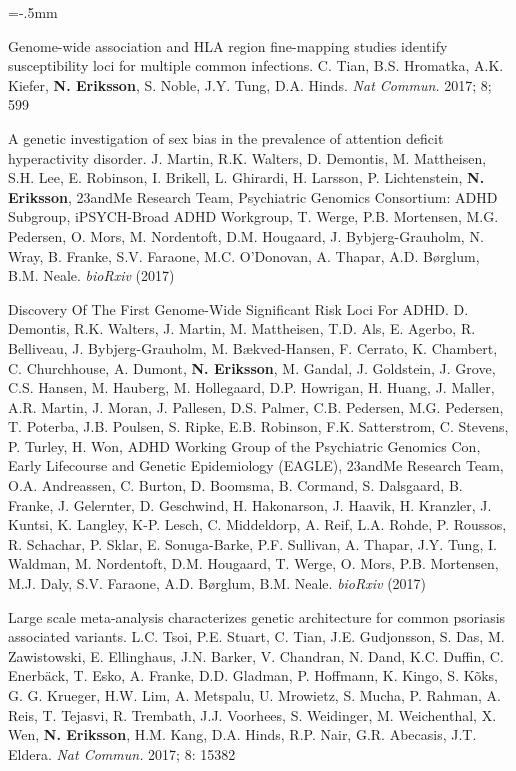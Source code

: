 \documentclass[11pt]{article}
\newenvironment{papers}[1][1]
	{\vspace{-2ex}\leftmargini=16.1mm%
	 \begin{revnumerate}[{#1}]\itemsep=-.5mm}
	{\end{revnumerate}\vspace{-2ex}}
\def\paper{\item}
\def\paperyear#1{\item[\addtocounter{enumi}{-1}%
		 {\makebox[0mm][r]{\makebox[14mm]{#1\hfill\arabic{enumi}.}}}]}
\begin{document}
\begin{papers}[47]
                    \paperyear{2017}
        Genome-wide association and HLA region fine-mapping studies identify susceptibility loci for multiple common infections.
        C. Tian, B.S. Hromatka, A.K. Kiefer, \textbf{N. Eriksson}, S. Noble, J.Y. Tung, D.A. Hinds.
        \textit{Nat Commun.} 2017; 8; 599

            \paper
        A genetic investigation of sex bias in the prevalence of attention deficit hyperactivity disorder.
        J. Martin, R.K. Walters, D. Demontis, M. Mattheisen, S.H. Lee, E. Robinson, I. Brikell, L. Ghirardi, H. Larsson, P. Lichtenstein, \textbf{N. Eriksson}, 23andMe Research Team, Psychiatric Genomics Consortium: ADHD Subgroup, iPSYCH-Broad ADHD Workgroup, T. Werge, P.B. Mortensen, M.G. Pedersen, O. Mors, M. Nordentoft, D.M. Hougaard, J. Bybjerg-Grauholm, N. Wray, B. Franke, S.V. Faraone, M.C. O'Donovan, A. Thapar, A.D. Børglum, B.M. Neale.
        \textit{bioRxiv} (2017)

            \paper
        Discovery Of The First Genome-Wide Significant Risk Loci For ADHD.
        D. Demontis, R.K. Walters, J. Martin, M. Mattheisen, T.D. Als, E. Agerbo, R. Belliveau, J. Bybjerg-Grauholm, M. Bækved-Hansen, F. Cerrato, K. Chambert, C. Churchhouse, A. Dumont, \textbf{N. Eriksson}, M. Gandal, J. Goldstein, J. Grove, C.S. Hansen, M. Hauberg, M. Hollegaard, D.P. Howrigan, H. Huang, J. Maller, A.R. Martin, J. Moran, J. Pallesen, D.S. Palmer, C.B. Pedersen, M.G. Pedersen, T. Poterba, J.B. Poulsen, S. Ripke, E.B. Robinson, F.K. Satterstrom, C. Stevens, P. Turley, H. Won, ADHD Working Group of the Psychiatric Genomics Con, Early Lifecourse and Genetic Epidemiology (EAGLE), 23andMe Research Team, O.A. Andreassen, C. Burton, D. Boomsma, B. Cormand, S. Dalsgaard, B. Franke, J. Gelernter, D. Geschwind, H. Hakonarson, J. Haavik, H. Kranzler, J. Kuntsi, K. Langley, K-P. Lesch, C. Middeldorp, A. Reif, L.A. Rohde, P. Roussos, R. Schachar, P. Sklar, E. Sonuga-Barke, P.F. Sullivan, A. Thapar, J.Y. Tung, I. Waldman, M. Nordentoft, D.M. Hougaard, T. Werge, O. Mors, P.B. Mortensen, M.J. Daly, S.V. Faraone, A.D. Børglum, B.M. Neale.
        \textit{bioRxiv} (2017)

            \paper
        Large scale meta-analysis characterizes genetic architecture for common psoriasis associated variants.
        L.C. Tsoi, P.E. Stuart, C. Tian, J.E. Gudjonsson, S. Das, M. Zawistowski, E. Ellinghaus, J.N. Barker, V. Chandran, N. Dand, K.C. Duffin, C. Enerbäck, T. Esko, A. Franke, D.D. Gladman, P. Hoffmann, K. Kingo, S. Kõks, G. G. Krueger, H.W. Lim, A. Metspalu, U. Mrowietz, S. Mucha, P. Rahman, A. Reis, T. Tejasvi, R. Trembath, J.J. Voorhees, S. Weidinger, M. Weichenthal, X. Wen, \textbf{N. Eriksson}, H.M. Kang, D.A. Hinds, R.P. Nair, G.R. Abecasis, J.T. Eldera.
        \textit{Nat Commun.} 2017; 8: 15382


\end{papers}
\end{document}
